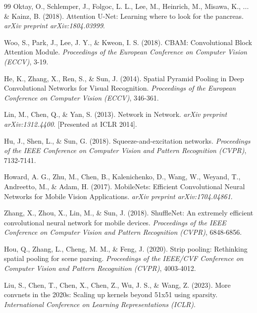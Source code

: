 \documentclass[10pt, a4paper, twocolumn]{article}
\begin{document}
\begin{thebibliography}{99}
Oktay, O., Schlemper, J., Folgoc, L. L., Lee, M., Heinrich, M., Misawa, K., ... \& Kainz, B. (2018). Attention U-Net: Learning where to look for the pancreas. \textit{arXiv preprint arXiv:1804.03999}.

Woo, S., Park, J., Lee, J. Y., \& Kweon, I. S. (2018). CBAM: Convolutional Block Attention Module. \textit{Proceedings of the European Conference on Computer Vision (ECCV)}, 3-19.

He, K., Zhang, X., Ren, S., \& Sun, J. (2014). Spatial Pyramid Pooling in Deep Convolutional Networks for Visual Recognition. \textit{Proceedings of the European Conference on Computer Vision (ECCV)}, 346-361.

Lin, M., Chen, Q., \& Yan, S. (2013). Network in Network. \textit{arXiv preprint arXiv:1312.4400}. [Presented at ICLR 2014].

Hu, J., Shen, L., \& Sun, G. (2018). Squeeze-and-excitation networks. \textit{Proceedings of the IEEE Conference on Computer Vision and Pattern Recognition (CVPR)}, 7132-7141.

Howard, A. G., Zhu, M., Chen, B., Kalenichenko, D., Wang, W., Weyand, T., Andreetto, M., \& Adam, H. (2017). MobileNets: Efficient Convolutional Neural Networks for Mobile Vision Applications. \textit{arXiv preprint arXiv:1704.04861}.

Zhang, X., Zhou, X., Lin, M., \& Sun, J. (2018). ShuffleNet: An extremely efficient convolutional neural network for mobile devices. \textit{Proceedings of the IEEE Conference on Computer Vision and Pattern Recognition (CVPR)}, 6848-6856.


Hou, Q., Zhang, L., Cheng, M. M., \& Feng, J. (2020). Strip pooling: Rethinking spatial pooling for scene parsing. \textit{Proceedings of the IEEE/CVF Conference on Computer Vision and Pattern Recognition (CVPR)}, 4003-4012.

Liu, S., Chen, T., Chen, X., Chen, Z., Wu, J. S., \& Wang, Z. (2023). More convnets in the 2020s: Scaling up kernels beyond 51x51 using sparsity. \textit{International Conference on Learning Representations (ICLR)}.


\end{thebibliography}
\end{document}
